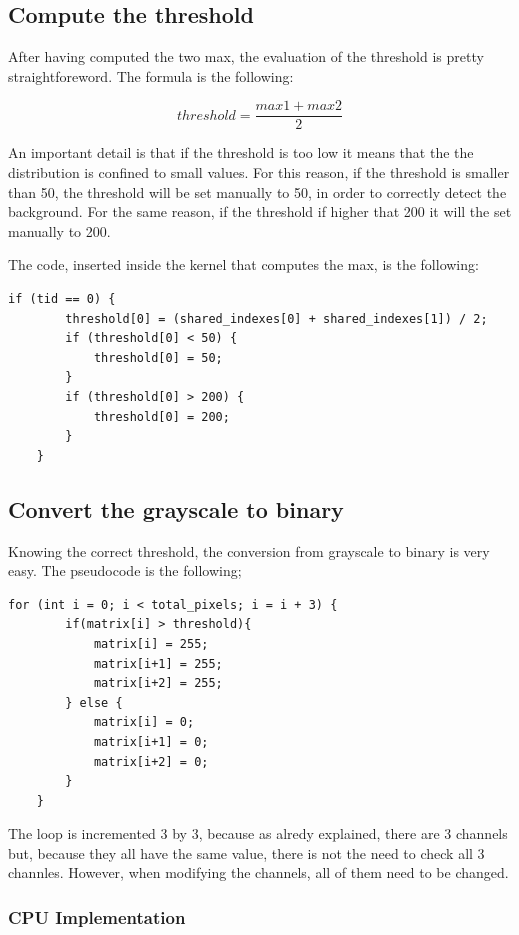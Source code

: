 \documentclass[paper=a4, fontsize=10pt]{scrartcl}	%
\begin{document}
	\subsection{Compute the threshold}

	After having computed the two max, the evaluation of the threshold is pretty straightforeword. The formula is the following:

	\begin{equation*}
		threshold = \frac{max1 + max2}{2}
	\end{equation*}


	An important detail is that if the threshold is too low it means that the the distribution is confined to small values. For this reason, if the threshold is smaller than 50, the threshold will be set manually to 50, in order to correctly detect the background. For the same reason, if the threshold if higher that 200 it will the set manually to 200.

	The code, inserted inside the kernel that computes the max, is the following:

	\begin{lstlisting}[style=CStyle]
	if (tid == 0) {
		threshold[0] = (shared_indexes[0] + shared_indexes[1]) / 2;
		if (threshold[0] < 50) {
			threshold[0] = 50;
		}
		if (threshold[0] > 200) {
			threshold[0] = 200;
		}
	}
	\end{lstlisting}

	\subsection{Convert the grayscale to binary}

	Knowing the correct threshold, the conversion from grayscale to binary is very easy. The pseudocode is the following;

	\begin{lstlisting}[style=CStyle]
	for (int i = 0; i < total_pixels; i = i + 3) {
		if(matrix[i] > threshold){
			matrix[i] = 255;
			matrix[i+1] = 255;
			matrix[i+2] = 255;
		} else {
			matrix[i] = 0;
			matrix[i+1] = 0;
			matrix[i+2] = 0;
		}
	}
	\end{lstlisting}

	The loop is incremented 3 by 3, because as alredy explained, there are 3 channels but, because they all have the same value, there is not the need to check all 3 channles. However, when modifying the channels, all of them need to be changed. 

	\subsubsection{CPU Implementation}
\end{document}
